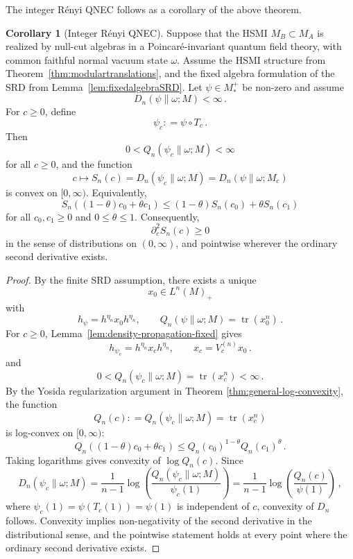 \documentclass[11pt,a4paper]{article}
\theoremstyle{plain}
\numberwithin{theorem}{section}
\theoremstyle{definition}
\newtheorem{corollary}[theorem]{Corollary}
\newcommand{\?}{\overset{?}{=}}
\newcommand{\defeq}{\mathrel{\mathop:}=}
\DeclareMathOperator{\tr}{tr}
\begin{document}
The integer R\'enyi QNEC follows as a corollary of the above theorem.
\begin{corollary}[Integer R\'enyi QNEC]
\label{cor:integer-renyi-qnec-fixed} 
Suppose that the HSMI \(M_B\subset M_A\) is realized by null-cut
algebras in a Poincar\'e-invariant quantum field theory, with common faithful normal vacuum state \(\omega\). 
Assume the HSMI structure from Theorem~\ref{thm:modulartranslations}, and the fixed algebra formulation of the SRD from Lemma~\ref{lem:fixedalgebraSRD}.  Let $\psi\in M_*^+$ be non-zero and assume
\[
  D_n(\psi\|\omega;M)<\infty\,.
\]
For $c\geq 0$, define
\[
  \psi_c \defeq \psi\circ T_c\,.
\]
Then
\[
  0< Q_n(\psi_c\|\omega;M)<\infty
\]
for all $c\geq 0$, and the function
\[
  c\longmapsto S_n(c)=D_n(\psi_c\|\omega;M)=D_n(\psi\|\omega;M_c)
\]
 is convex on $[0,\infty)$.  Equivalently,
 \[
    S_n((1-\theta)c_0+\theta c_1)
  \leq (1-\theta)S_n(c_0)
     +\theta S_n(c_1)
 \]
for all $c_0,c_1\geq 0$ and $0\leq\theta\leq 1$.  Consequently,
\[
  \partial_c^2S_n(c)\geq 0
\]
 in the sense of distributions on $(0,\infty)$, and pointwise wherever the ordinary second derivative exists.
\end{corollary}
\begin{proof}
By the finite SRD assumption, there exists a unique
\begin{equation*}
  x_0\in L^n(M)_+
\end{equation*}
with
\begin{equation*}
  h_\psi=h^{\eta_n}x_0h^{\eta_n},
  \qquad
  Q_n(\psi\|\omega;M)=\tr(x_0^n)\,.
\end{equation*}
For $c\geq 0$, Lemma~\ref{lem:density-propagation-fixed} gives
\begin{equation*}
  h_{\psi_c}=h^{\eta_n}x_ch^{\eta_n},
  \qquad
  x_c=V_c^{(n)}x_0\,.
\end{equation*}
and 
\begin{equation*}
  0< Q_n(\psi_c\|\omega;M)=\tr(x_c^n)<\infty\,.
\end{equation*}
By the Yosida regularization argument in Theorem \ref{thm:general-log-convexity}, the function
\begin{equation*}
  Q_n(c) \defeq Q_n(\psi_c\|\omega;M)=\tr(x_c^n)
\end{equation*}
 is log-convex on $[0,\infty)$:
\begin{equation*}
  Q_n((1-\theta)c_0+\theta c_1)
  \leq Q_n(c_0)^{1-\theta}Q_n(c_1)^\theta\,.
\end{equation*}
Taking logarithms gives convexity of $\log Q_n(c)$.  Since
\begin{equation*}
  D_n(\psi_c\|\omega;M)
  =\frac{1}{n-1}\log\left(\frac{Q_n(\psi_c\|\omega;M)}{\psi_c(1)}\right)
  =\frac{1}{n-1}\log\left(\frac{Q_n(c)}{\psi(1)}\right)\,,
\end{equation*}
where $\psi_c(1)=\psi(T_c(1))=\psi(1)$ is independent of $c$, convexity of $D_n$ follows.  Convexity implies non-negativity of the second derivative in the distributional sense, and the pointwise statement holds at every point where the ordinary second derivative exists.
\end{proof}
\end{document}
